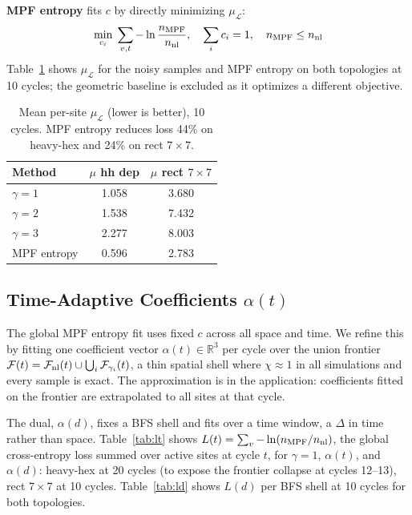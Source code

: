 \documentclass[letterpaper]{article}
\begin{document}
\textbf{MPF entropy} fits $c$ by directly minimizing $\mu_\mathcal{L}$:
\begin{equation}
    \min_{c_i}\; \sum_{v,t} -\ln\frac{n_{\rm MPF}}{n_{\rm nl}},\quad
    \sum_i c_i = 1,\quad n_{\rm MPF} \leq n_{\rm nl}
    \label{eq:entropy_mpf}
\end{equation}
Table~\ref{tab:entropy} shows $\mu_\mathcal{L}$ for the noisy samples
and MPF entropy on both topologies at 10 cycles; the geometric baseline
is excluded as it optimizes a different objective.

\begin{table}[t]
\centering
\small
\begin{tabular}{lcc}
\toprule
Method & $\mu$ hh dep & $\mu$ rect $7{\times}7$ \\
\midrule
$\gamma=1$       & 1.058 & 3.680 \\
$\gamma=2$       & 1.538 & 7.432 \\
$\gamma=3$       & 2.277 & 8.003 \\
\midrule
MPF entropy      & 0.596 & 2.783 \\
\bottomrule
\end{tabular}
\caption{Mean per-site $\mu_\mathcal{L}$ (lower is better), 10 cycles.
MPF entropy reduces loss 44\% on heavy-hex and 24\% on rect $7\times7$.}
\label{tab:entropy}
\end{table}

\subsection{Time-Adaptive Coefficients $\alpha(t)$}

The global MPF entropy fit uses fixed $c$ across all space and time.
We refine this by fitting one coefficient vector $\alpha(t)\in\mathbb{R}^3$
per cycle over the union frontier
$\mathcal{F}(t) = \mathcal{F}_{\rm nl}(t) \cup \bigcup_i \mathcal{F}_{\gamma_i}(t)$,
a thin spatial shell where $\chi\approx1$ in all simulations and every
sample is exact.
The approximation is in the application: coefficients fitted on the
frontier are extrapolated to all sites at that cycle.

The dual, $\alpha(d)$, fixes a BFS shell and fits over a time window,
a $\Delta$ in time rather than space.
Table~\ref{tab:lt} shows $L(t) = \sum_v -\ln(n_{\rm MPF}/n_{\rm nl})$,
the global cross-entropy loss summed over active sites at cycle $t$, for $\gamma=1$, $\alpha(t)$,
and $\alpha(d)$: heavy-hex at 20 cycles (to expose the frontier
collapse at cycles 12--13), rect $7\times7$ at 10 cycles.
Table~\ref{tab:ld} shows $L(d)$ per BFS shell at 10 cycles for both
topologies.
\end{document}
